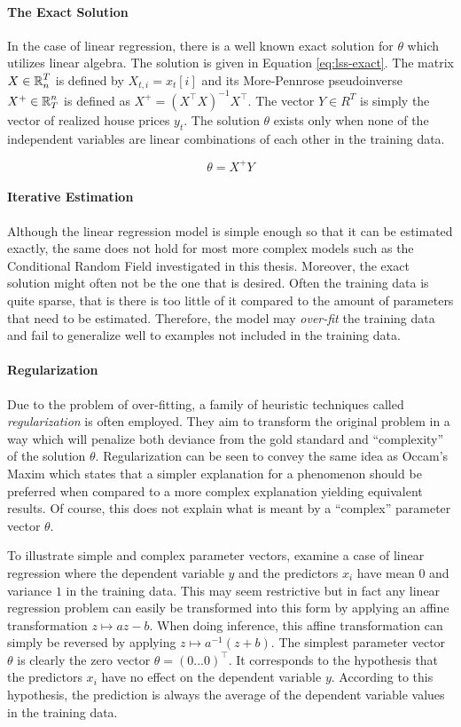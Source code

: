 \paragraph{The Exact Solution} In the case of linear regression, there
is a well known exact solution for $\theta$ which utilizes linear
algebra. The solution is given in Equation \ref{eq:lss-exact}. The
matrix $X \in \mbox{$\mathbb R$}^T_n$ is defined by $X_{t,i} = x_t[i]$ and its
More-Pennrose pseudoinverse $X^+ \in \mbox{$\mathbb R$}^n_T$ is defined as $X^+ =
(X^\top X)^{-1}X^\top$. The vector $Y \in R^T$ is simply the vector of
realized house prices $y_t$. The solution $\theta$ exists only when
none of the independent variables are linear combinations of each
other in the training data.

\begin{equation}
\theta = X^+ Y \label{eq:lss-exact}
\end{equation}

\paragraph{Iterative Estimation} Although the linear regression model
is simple enough so that it can be estimated exactly, the same does
not hold for most more complex models such as the Conditional Random
Field investigated in this thesis. Moreover, the exact solution might
often not be the one that is desired. Often the training data is quite
sparse, that is there is too little of it compared to the amount of
parameters that need to be estimated. Therefore, the model may {\it
  over-fit} the training data and fail to generalize well to examples
not included in the training data. 

\paragraph{Regularization} Due to the problem of over-fitting, a family
of heuristic techniques called {\it regularization} is often
employed. They aim to transform the original problem in a way which
will penalize both deviance from the gold standard and ``complexity''
of the solution $\theta$. Regularization can be seen to convey the
same idea as Occam's Maxim which states that a simpler explanation for
a phenomenon should be preferred when compared to a more complex
explanation yielding equivalent results. Of course, this does not
explain what is meant by a ``complex'' parameter vector $\theta$.

To illustrate simple and complex parameter vectors, examine a case of
linear regression where the dependent variable $y$ and the predictors
$x_i$ have mean $0$ and variance $1$ in the training data. This may
seem restrictive but in fact any linear regression problem can easily
be transformed into this form by applying an affine transformation $z
\mapsto az - b$. When doing inference, this affine transformation can
simply be reversed by applying $z \mapsto a^{-1} (z + b)$. The
simplest parameter vector $\theta$ is clearly the zero vector $\theta
= (0 ... 0)^\top$. It corresponds to the hypothesis that the
predictors $x_i$ have no effect on the dependent variable
$y$. According to this hypothesis, the prediction is always the
average of the dependent variable values in the training data.

